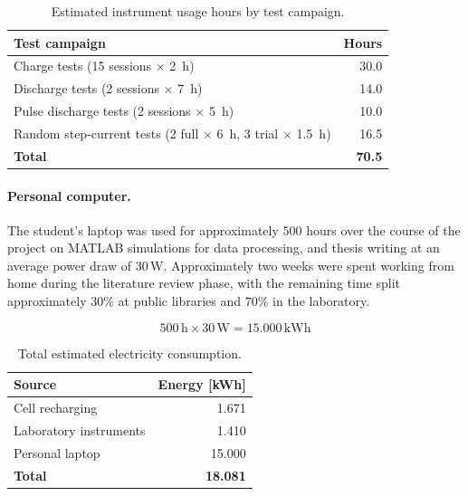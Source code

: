 \begin{table}[H]
    \centering
    \begin{tabular}{lr}
        \toprule
        \textbf{Test campaign} & \textbf{Hours} \\
        \midrule
        Charge tests (15 sessions $\times$ 2~h)                  & 30.0 \\
        Discharge tests (2 sessions $\times$ 7~h)                & 14.0 \\
        Pulse discharge tests (2 sessions $\times$ 5~h)          & 10.0 \\
        Random step-current tests (2 full $\times$ 6~h, 3 trial $\times$ 1.5~h) & 16.5 \\
        \midrule
        \textbf{Total} & \textbf{70.5} \\
        \bottomrule
    \end{tabular}
    \caption{Estimated instrument usage hours by test campaign.}
    \label{tab:InstrumentHours}
\end{table}

\paragraph{Personal computer.} The student's laptop was used for approximately 
$500$ hours over the course of the project on MATLAB simulations for data 
processing, and thesis writing at an average power draw of $30\,\text{W}$. 
Approximately two weeks were spent working from home during the 
literature review phase, with the remaining time split approximately $30\%$ at public 
libraries and $70\%$ in the laboratory.

\begin{equation}
    500\,\text{h} \times 30\,\text{W} = 15.000\,\text{kWh}
\end{equation}

\begin{table}[H]
    \centering
    \begin{tabular}{lr}
        \toprule
        \textbf{Source} & \textbf{Energy [kWh]} \\
        \midrule
        Cell recharging                & 1.671 \\
        Laboratory instruments         & 1.410 \\
        Personal laptop                & 15.000 \\
        \midrule
        \textbf{Total}                 & \textbf{18.081} \\
        \bottomrule
    \end{tabular}
    \caption{Total estimated electricity consumption.}
    \label{tab:TotalElectricityEnv}
\end{table}


